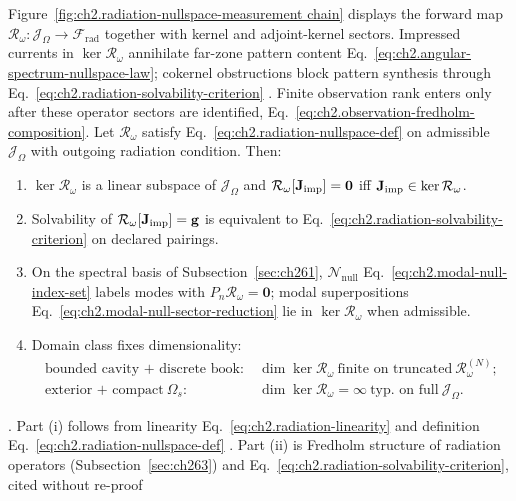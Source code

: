 Figure~\ref{fig:ch2.radiation-nullspace-measurement chain} displays the forward map
$\mathcal{R}_\omega:\mathcal{J}_\Omega\to\mathcal{F}_{\mathrm{rad}}$ together with kernel and
adjoint-kernel sectors. Impressed currents in $\ker\mathcal{R}_\omega$ annihilate far-zone pattern
content Eq.~\eqref{eq:ch2.angular-spectrum-nullspace-law}; cokernel obstructions block pattern
synthesis through Eq.~\eqref{eq:ch2.radiation-solvability-criterion} \cite{stratton1941}.
Finite observation rank enters only after these operator sectors are identified,
Eq.~\eqref{eq:ch2.observation-fredholm-composition}.
\label{thm:ch2.radiation-nullspace-structure}
Let \(\mathcal{R}_\omega\) satisfy Eq.~\eqref{eq:ch2.radiation-nullspace-def} on admissible
\(\mathcal{J}_\Omega\) with outgoing radiation condition. Then:
\begin{enumerate}
\item[(i)] \(\ker\mathcal{R}_\omega\) is a linear subspace of \(\mathcal{J}_\Omega\) and
\(\mathcal{R}_\omega[\mathbf{J}_{\mathrm{imp}}]=\mathbf{0}\) iff \(\mathbf{J}_{\mathrm{imp}}\in\ker\mathcal{R}_\omega\).
\item[(ii)] Solvability of \(\mathcal{R}_\omega[\mathbf{J}_{\mathrm{imp}}]=\mathbf{g}\) is equivalent to
Eq.~\eqref{eq:ch2.radiation-solvability-criterion} on declared pairings.
\item[(iii)] On the spectral basis of Subsection~\ref{sec:ch261},
\(\mathcal{N}_{\mathrm{null}}\) Eq.~\eqref{eq:ch2.modal-null-index-set} labels modes with
\(P_n\mathcal{R}_\omega=\mathbf{0}\); modal superpositions
Eq.~\eqref{eq:ch2.modal-null-sector-reduction} lie in \(\ker\mathcal{R}_\omega\) when
admissible.
\item[(iv)] Domain class fixes dimensionality:
\begin{equation}
\label{eq:ch2.nullspace-dimensional-classification}
\begin{aligned}
\text{bounded cavity + discrete book:}\ &
\dim\ker\mathcal{R}_\omega\ \text{finite on truncated}\ \mathcal{R}_\omega^{(N)};\\
\text{exterior + compact}\ \Omega_s:\ &
\dim\ker\mathcal{R}_\omega=\infty\ \text{typ. on full}\ \mathcal{J}_\Omega.
\end{aligned}
\end{equation}
\end{enumerate}. Part (i) follows from linearity Eq.~\eqref{eq:ch2.radiation-linearity} and definition
Eq.~\eqref{eq:ch2.radiation-nullspace-def} \cite{stratton1941}. Part (ii) is Fredholm structure of radiation operators (Subsection~\ref{sec:ch263}) and
Eq.~\eqref{eq:ch2.radiation-solvability-criterion}, cited without re-proof
